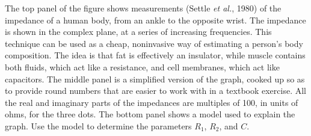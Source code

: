 The top panel of the figure shows measurements (Settle \emph{et al.}, 1980) of the impedance of a human
body, from an ankle to the opposite wrist. The impedance is shown
in the complex plane, at a series of increasing frequencies. This
technique can be used as a cheap, noninvasive way of estimating a person's body
composition. The idea is that fat is effectively an insulator, while muscle
contains both fluids, which act like a resistance, and cell membranes, which
act like capacitors. The middle panel is a simplified version of the graph,
cooked up so as to provide round numbers that are easier to work with in a textbook
exercise. All the real and imaginary parts of the impedances are multiples of 100,
in units of ohms, for the three dots. The bottom panel shows a model used to explain the graph.
Use the model to determine the parameters
$R_1$, $R_2$, and $C$.\answercheck
